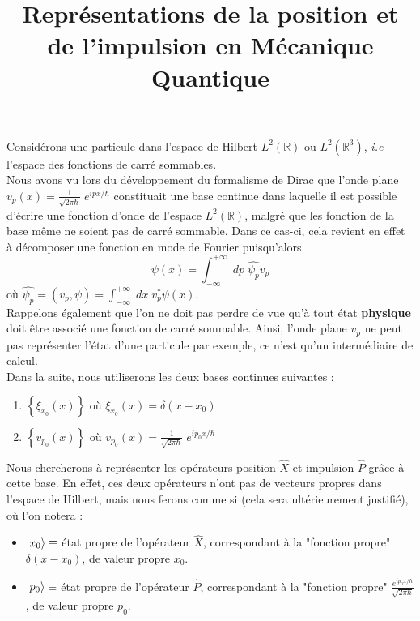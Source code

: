 \documentclass{article}
\title{Représentations de la position et de l'impulsion en Mécanique Quantique}
\date{}
\begin{document}
 
 \maketitle

 Considérons une particule dans l'espace de Hilbert $L^2(\mathbb{R})$ ou $L^2(\mathbb{R}^3)$, \textit{i.e} l'espace des fonctions de carré sommables. \\

Nous avons vu lors du développement du formalisme de Dirac que l'onde plane $v_p(x) = \frac{1}{\sqrt{2 \pi \hbar}} \; e^{ipx/\hbar}$ constituait une base continue dans laquelle il est possible d'écrire une fonction d'onde de l'espace $L^2(\mathbb{R})$, malgré que les fonction de la base même ne soient pas de carré sommable. Dans ce cas-ci, cela revient en effet à décomposer une fonction en mode de Fourier puisqu'alors $$ \psi(x) = \int_{-\infty}^{+\infty} \; dp \; \hat{\psi_p} v_p $$ où $\hat{\psi_p} = (v_p, \psi) = \int_{-\infty}^{+\infty} \; dx \; v_p^* \psi(x)$. \\
Rappelons également que l'on ne doit pas perdre de vue qu'à tout état \textbf{physique} doit être associé une fonction de carré sommable. Ainsi, l'onde plane $v_p$ ne peut pas représenter l'état d'une particule par exemple, ce n'est qu'un intermédiaire de calcul. \\

Dans la suite, nous utiliserons les deux bases continues suivantes : 
\begin{enumerate}
    \item $\left\{ \xi_{x_0}(x) \right\}$ où $\xi_{x_0}(x) = \delta(x-x_0)$ 
    \item $\left\{ v_{p_0}(x) \right\}$ où $v_{p_0}(x) = \frac{1}{\sqrt{2\pi \hbar}} \; e^{ip_0 x/\hbar}$ \\
\end{enumerate}
Nous chercherons à représenter les opérateurs position $\hat{X}$ et impulsion $\hat{P}$ grâce à cette base. En effet, ces deux opérateurs n'ont pas de vecteurs propres dans l'espace de Hilbert, mais nous ferons comme si (cela sera ultérieurement justifié), où l'on notera : 
\begin{itemize}[label = \textbullet]
    \item $\ket{x_0} \equiv$ état propre de l'opérateur $\hat{X}$, correspondant à la "fonction propre" $\delta(x-x_0)$, de valeur propre $x_0$. 
    \item $\ket{p_0} \equiv$ état propre de l'opérateur $\hat{P}$, correspondant à la "fonction propre" $\frac{e^{ip_0 x/\hbar}}{\sqrt{2 \pi \hbar}}$, de valeur propre $p_0$. 
\end{itemize}
\end{document}
